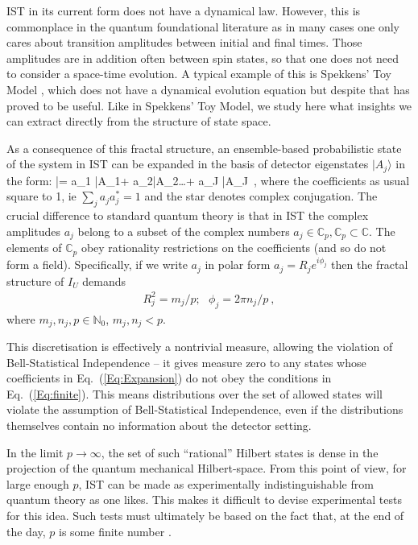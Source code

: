 \documentclass[12pt]{article}
\makeatletter
\newcommand\be{\@ifstar{\[}{\begin{equation}}}
\newcommand\ee{\@ifstar{\]}{\end{equation}}}
\makeatother
\begin{document}
{\sc IST} in its current form does not have a dynamical law. However, this is commonplace in the quantum foundational literature as in many cases one only cares about transition amplitudes between initial and final times. Those amplitudes are in addition often between spin states, so that one does not need to consider a space-time evolution. A typical example of this is Spekkens' Toy Model \mbox{\cite{Spekkens2007Evidence}}, which does not have a dynamical evolution equation but despite that has proved to be useful. Like in Spekkens' Toy Model, we study here what insights we can extract directly from the structure of state space.

As a consequence of this fractal structure, an ensemble-based probabilistic state of the system in {\sc IST} can be expanded in the basis of detector eigenstates $|A_j \rangle$ in the form:
\be\label{Eq:Expansion}
|\psi\rangle = a_1 |A_1\rangle + a_2|A_2\rangle \ldots + a_J |A_J\rangle~,
\ee
where the coefficients as usual square to 1, ie $\sum_j a_j a^*_j =1$ and the star denotes complex conjugation.
The crucial difference to standard quantum theory is that in {\sc IST} the complex amplitudes $a_j$ belong to a subset of the complex numbers $a_j \in \mathbb C_p, \mathbb C_p \subset \mathbb C$. The elements of $\mathbb C_p$ obey rationality restrictions on the coefficients (and so do not form a field). Specifically, if we write $a_j$ in polar form $a_j=R_j e^{i \phi_j}$ then the fractal structure of $I_U$ demands
\begin{eqnarray}
\label{Eq:finite}
R^2_j=m_j/p; \ \ \ 
\phi_j = 2\pi n_j/p~,
\end{eqnarray}
where $m_j,n_j,p \in {\mathbb N}_0$, $m_j,n_j < p$.

This discretisation is effectively a nontrivial measure, allowing the violation of Bell-Statistical Independence -- it gives measure zero to any states whose coefficients in Eq.\ (\ref{Eq:Expansion}) do not obey the conditions in Eq.\ (\mbox{\ref{Eq:finite}}). This means distributions over the set of allowed states will violate the assumption of Bell-Statistical Independence, even if the distributions themselves contain no information about the detector setting.

In the limit $p \rightarrow \infty$, the set of such ``rational'' Hilbert states is dense in the projection of the quantum mechanical Hilbert-space. From this point of view, for large enough $p$, {\sc IST} can be made as experimentally indistinguishable from quantum theory as one likes. This makes it difficult to devise experimental tests for this idea. Such tests must ultimately be based on the fact that, at the end of the day, $p$ is some finite number \cite{Hance2021ExpIST}. 
\end{document}
